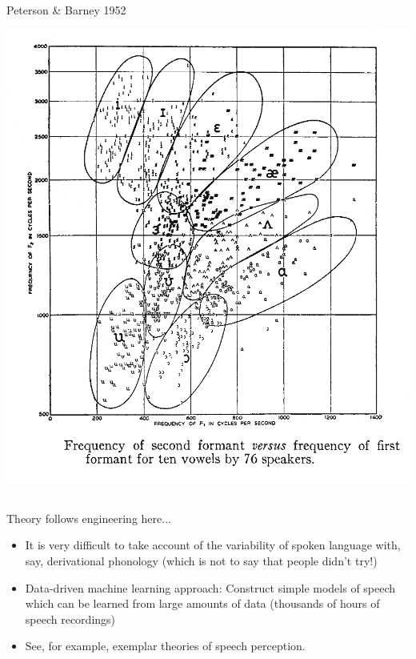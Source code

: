 \documentclass[9pt,xcolor=pdftex,dvipsnames,table]{beamer}
\begin{document}
\subsection{}
\begin{frame}{Peterson \& Barney 1952}

	\begin{center}
    \includegraphics[scale=.5]{PetersonBarney52}
	\end{center}
	
\end{frame}

\subsection{}
\begin{frame}{Theory follows engineering here...}

\begin{itemize}
	\item It is very difficult to take account of the variability of spoken
language with, say, derivational phonology (which is not to say that people didn't try!)

	\item Data-driven machine learning approach: Construct simple models of
speech which can be learned from large amounts of data (thousands of hours of speech recordings)

	\item See, for example, exemplar theories of speech perception.
\end{itemize}

\end{frame}
\end{document}
